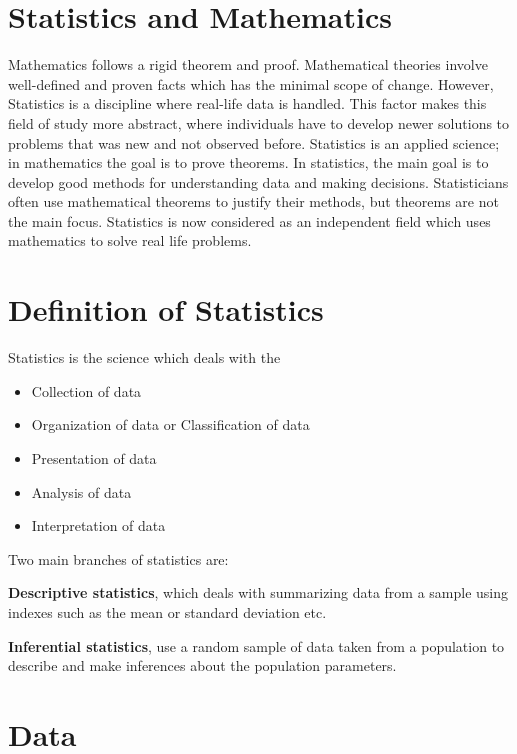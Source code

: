 \documentclass[
]{book}
\begin{document}
\hypertarget{statistics-and-mathematics}{%
\section{Statistics and Mathematics}\label{statistics-and-mathematics}}

Mathematics follows a rigid theorem and proof. Mathematical theories involve well-defined and proven facts which has the minimal scope of change. However, Statistics is a discipline where real-life data is handled. This factor makes this field of study more abstract, where individuals have to develop newer solutions to problems that was new and not observed before. Statistics is an applied science; in mathematics the goal is to prove theorems. In statistics, the main goal is to develop good methods for understanding data and making decisions. Statisticians often use mathematical theorems to justify their methods, but theorems are not the main focus. Statistics is now considered as an independent field which uses mathematics to solve real life problems.

\hypertarget{definition-of-statistics}{%
\section{Definition of Statistics}\label{definition-of-statistics}}

Statistics is the science which deals with the

\begin{itemize}
\item
  Collection of data
\item
  Organization of data or Classification of data
\item
  Presentation of data
\item
  Analysis of data
\item
  Interpretation of data
\end{itemize}

Two main branches of statistics are:

\textbf{Descriptive statistics}, which deals with summarizing data from a sample using indexes such as the mean or standard deviation etc.

\textbf{Inferential statistics}, use a random sample of data taken from a population to describe and make inferences about the population parameters.

\hypertarget{data}{%
\section{Data}\label{data}}
\end{document}
